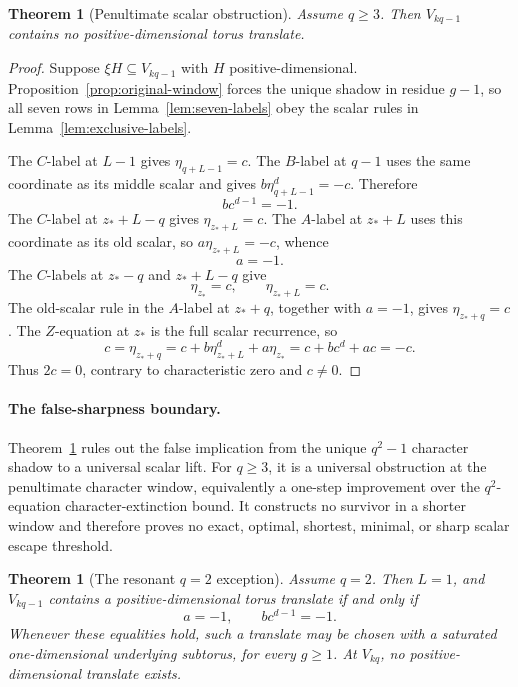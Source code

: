 \documentclass[11pt]{article}
\newtheorem{theorem}[lemma]{Theorem}
\theoremstyle{remark}
\numberwithin{equation}{section}
\begin{document}
\begin{theorem}[Penultimate scalar obstruction]\label{thm:scalar-obstruction}
Assume \(q\geq3\).  Then \(V_{kq-1}\) contains no positive-dimensional torus translate.
\end{theorem}

\begin{proof}
Suppose \(\xi H\subseteq V_{kq-1}\) with \(H\) positive-dimensional.  Proposition~\ref{prop:original-window} forces the unique shadow in residue \(g-1\), so all seven rows in Lemma~\ref{lem:seven-labels} obey the scalar rules in Lemma~\ref{lem:exclusive-labels}.

The \(C\)-label at \(L-1\) gives \(\eta_{q+L-1}=c\).  The \(B\)-label at \(q-1\) uses the same coordinate as its middle scalar and gives \(b\eta_{q+L-1}^d=-c\).  Therefore
\begin{equation}\label{eq:first-scalar-obstruction}
 bc^{d-1}=-1.
\end{equation}
The \(C\)-label at \(z_\ast+L-q\) gives \(\eta_{z_\ast+L}=c\).  The \(A\)-label at \(z_\ast+L\) uses this coordinate as its old scalar, so \(a\eta_{z_\ast+L}=-c\), whence
\begin{equation}\label{eq:second-scalar-obstruction}
 a=-1.
\end{equation}
The \(C\)-labels at \(z_\ast-q\) and \(z_\ast+L-q\) give
\[
 \eta_{z_\ast}=c,\qquad \eta_{z_\ast+L}=c.
\]
The old-scalar rule in the \(A\)-label at \(z_\ast+q\), together with \(a=-1\), gives \(\eta_{z_\ast+q}=c\).  The \(Z\)-equation at \(z_\ast\) is the full scalar recurrence, so
\[
 c=\eta_{z_\ast+q}
   =c+b\eta_{z_\ast+L}^d+a\eta_{z_\ast}
   =c+bc^d+ac=-c.
\]
Thus \(2c=0\), contrary to characteristic zero and \(c\neq0\).
\end{proof}

\paragraph{The false-sharpness boundary.}
Theorem~\ref{thm:scalar-obstruction} rules out the false implication from the unique \(q^2-1\) character shadow to a universal scalar lift.  For \(q\geq3\), it is a universal obstruction at the penultimate character window, equivalently a one-step improvement over the \(q^2\)-equation character-extinction bound.  It constructs no survivor in a shorter window and therefore proves no exact, optimal, shortest, minimal, or sharp scalar escape threshold.

\begin{theorem}[The resonant \(q=2\) exception]\label{thm:q2-resonance}
Assume \(q=2\).  Then \(L=1\), and \(V_{kq-1}\) contains a positive-dimensional torus translate if and only if
\begin{equation}\label{eq:q2-resonance}
 a=-1,\qquad bc^{d-1}=-1.
\end{equation}
Whenever these equalities hold, such a translate may be chosen with a saturated one-dimensional underlying subtorus, for every \(g\geq1\).  At \(V_{kq}\), no positive-dimensional translate exists.
\end{theorem}
\end{document}
